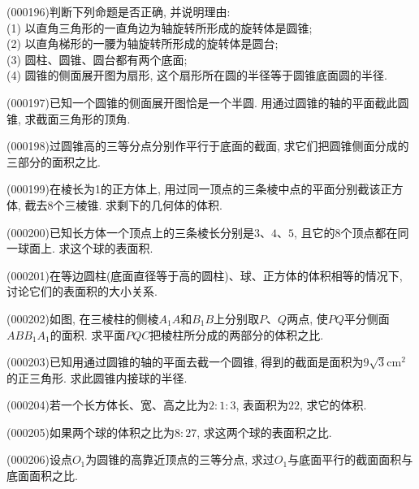\item (000196)判断下列命题是否正确, 并说明理由:\\
(1) 以直角三角形的一直角边为轴旋转所形成的旋转体是圆锥;\\
(2) 以直角梯形的一腰为轴旋转所形成的旋转体是圆台;\\
(3) 圆柱、圆锥、圆台都有两个底面;\\
(4) 圆锥的侧面展开图为扇形, 这个扇形所在圆的半径等于圆锥底面圆的半径.
\item (000197)已知一个圆锥的侧面展开图恰是一个半圆. 用通过圆锥的轴的平面截此圆锥, 求截面三角形的顶角.
\item (000198)过圆锥高的三等分点分别作平行于底面的截面, 求它们把圆锥侧面分成的三部分的面积之比.
\item (000199)在棱长为1的正方体上, 用过同一顶点的三条棱中点的平面分别截该正方体, 截去$8$个三棱锥. 求剩下的几何体的体积.
\item (000200)已知长方体一个顶点上的三条棱长分别是$3$、$4$、$5$, 且它的$8$个顶点都在同一球面上. 求这个球的表面积.
\item (000201)在等边圆柱(底面直径等于高的圆柱)、球、正方体的体积相等的情况下, 讨论它们的表面积的大小关系.
\item (000202)如图, 在三棱柱的侧棱$A_1A$和$B_1B$上分别取$P$、$Q$两点, 使$PQ$平分侧面$ABB_1A_1$的面积. 求平面$PQC$把棱柱所分成的两部分的体积之比.
\begin{center}
\end{center}
\item (000203)已知用通过圆锥的轴的平面去截一个圆锥, 得到的截面是面积为$9\sqrt 3\text{cm}^2$的正三角形. 求此圆锥内接球的半径.
\item (000204)若一个长方体长、宽、高之比为$2:1:3$, 表面积为$22$, 求它的体积.
\item (000205)如果两个球的体积之比为$8:27$, 求这两个球的表面积之比.
\item (000206)设点$O_1$为圆锥的高靠近顶点的三等分点, 求过$O_1$与底面平行的截面面积与底面面积之比.
